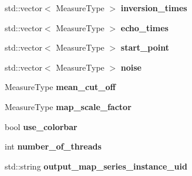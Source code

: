 \begin{DoxyCompactItemize}
\item 
std\+::vector$<$ Measure\+Type $>$ {\bfseries inversion\+\_\+times}\hypertarget{class_ox_1_1_tomato_options_a25ba668395a12d8e1a316b8a151a9ccb}{}\label{class_ox_1_1_tomato_options_a25ba668395a12d8e1a316b8a151a9ccb}

\item 
std\+::vector$<$ Measure\+Type $>$ {\bfseries echo\+\_\+times}\hypertarget{class_ox_1_1_tomato_options_ac5ee7b4f4da34122a87d7cb7c3b862ce}{}\label{class_ox_1_1_tomato_options_ac5ee7b4f4da34122a87d7cb7c3b862ce}

\item 
std\+::vector$<$ Measure\+Type $>$ {\bfseries start\+\_\+point}\hypertarget{class_ox_1_1_tomato_options_afe2b53753dec345123550b7788fc9e94}{}\label{class_ox_1_1_tomato_options_afe2b53753dec345123550b7788fc9e94}

\item 
std\+::vector$<$ Measure\+Type $>$ {\bfseries noise}\hypertarget{class_ox_1_1_tomato_options_a208ad05725976cbacb0161d8df703c53}{}\label{class_ox_1_1_tomato_options_a208ad05725976cbacb0161d8df703c53}

\item 
Measure\+Type {\bfseries mean\+\_\+cut\+\_\+off}\hypertarget{class_ox_1_1_tomato_options_a11a86c81ea821645cfd2561cb7b2926e}{}\label{class_ox_1_1_tomato_options_a11a86c81ea821645cfd2561cb7b2926e}

\item 
Measure\+Type {\bfseries map\+\_\+scale\+\_\+factor}\hypertarget{class_ox_1_1_tomato_options_a0c5f898aa62fb78ad0e34d24ca68d69e}{}\label{class_ox_1_1_tomato_options_a0c5f898aa62fb78ad0e34d24ca68d69e}

\item 
bool {\bfseries use\+\_\+colorbar}\hypertarget{class_ox_1_1_tomato_options_a9f132eaa68f293dcd97a15bbd401ea4d}{}\label{class_ox_1_1_tomato_options_a9f132eaa68f293dcd97a15bbd401ea4d}

\item 
int {\bfseries number\+\_\+of\+\_\+threads}\hypertarget{class_ox_1_1_tomato_options_a6063efc002b3fc5306ebb6f8e8bc7bd5}{}\label{class_ox_1_1_tomato_options_a6063efc002b3fc5306ebb6f8e8bc7bd5}

\item 
std\+::string {\bfseries output\+\_\+map\+\_\+series\+\_\+instance\+\_\+uid}\hypertarget{class_ox_1_1_tomato_options_a678e2d42fcea7494760a7653d58d4bac}{}\label{class_ox_1_1_tomato_options_a678e2d42fcea7494760a7653d58d4bac}


\end{DoxyCompactItemize}
